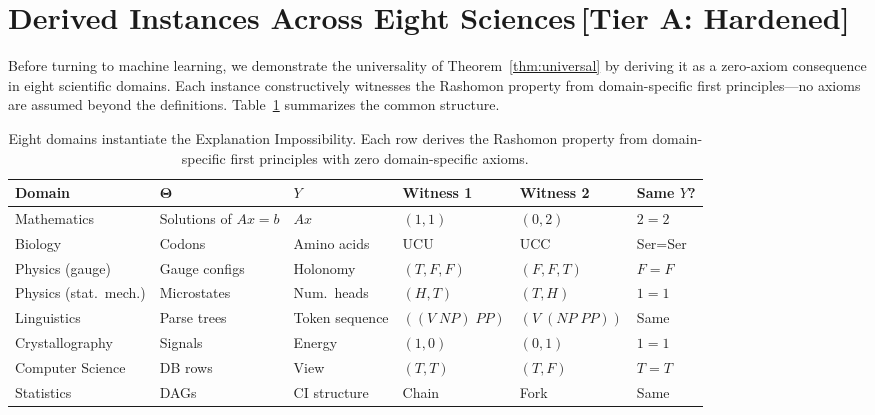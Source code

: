 \documentclass[11pt,a4paper]{article}
\newcommand{\Params}{\mathbf{\Theta}}
\begin{document}
\section{Derived Instances Across Eight Sciences\,\textnormal{\normalsize[Tier A: Hardened]}}
\label{sec:derived-instances}

Before turning to machine learning, we demonstrate the universality of
Theorem~\ref{thm:universal} by deriving it as a zero-axiom consequence in
eight scientific domains.  Each instance constructively witnesses the Rashomon
property from domain-specific first principles---no axioms are assumed beyond
the definitions.  Table~\ref{tab:unification} summarizes the common structure.

\begin{table}[t]
\centering
\caption{Eight domains instantiate the Explanation Impossibility. Each row derives the Rashomon property from domain-specific first principles with zero domain-specific axioms.}
\label{tab:unification}
\small\setlength{\tabcolsep}{4pt}\begin{tabular}{@{}llllll@{}}
\toprule
Domain & $\Params$ & $Y$ & Witness 1 & Witness 2 & Same $Y$? \\
\midrule
Mathematics & Solutions of $Ax=b$ & $Ax$ & $(1,1)$ & $(0,2)$ & $2=2$ \\
Biology & Codons & Amino acids & UCU & UCC & Ser=Ser \\
Physics (gauge) & Gauge configs & Holonomy & $(T,F,F)$ & $(F,F,T)$ & $F=F$ \\
Physics (stat.\ mech.) & Microstates & Num.\ heads & $(H,T)$ & $(T,H)$ & $1=1$ \\
Linguistics & Parse trees & Token sequence & $((V\;NP)\;PP)$ & $(V\;(NP\;PP))$ & Same \\
Crystallography & Signals & Energy & $(1,0)$ & $(0,1)$ & $1=1$ \\
Computer Science & DB rows & View & $(T,T)$ & $(T,F)$ & $T=T$ \\
Statistics & DAGs & CI structure & Chain & Fork & Same \\
\bottomrule
\end{tabular}
\end{table}






\end{document}
